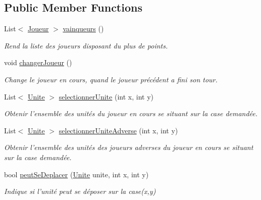 \subsection*{Public Member Functions}
\begin{DoxyCompactItemize}
\item 
List$<$ \hyperlink{class_small_world_1_1_joueur}{Joueur} $>$ \hyperlink{interface_small_world_1_1_inter_partie_a854e4e9df304af71203a90ebea6dd5aa}{vainqueurs} ()
\begin{DoxyCompactList}\small\item\em Rend la liste des joueurs disposant du plus de points. \end{DoxyCompactList}\item 
void \hyperlink{interface_small_world_1_1_inter_partie_a9d379ea16f666ff33913f4c4bb0ac148}{changer\-Joueur} ()
\begin{DoxyCompactList}\small\item\em Change le joueur en cours, quand le joueur précédent a fini son tour. \end{DoxyCompactList}\item 
List$<$ \hyperlink{class_small_world_1_1_unite}{Unite} $>$ \hyperlink{interface_small_world_1_1_inter_partie_aa29e03573a21b6d366bfb8dfb7bd50c3}{selectionner\-Unite} (int x, int y)
\begin{DoxyCompactList}\small\item\em Obtenir l'ensemble des unités du joueur en cours se situant sur la case demandée. \end{DoxyCompactList}\item 
List$<$ \hyperlink{class_small_world_1_1_unite}{Unite} $>$ \hyperlink{interface_small_world_1_1_inter_partie_a3ee997cdbcf1402c3aed3fbad6ff8c56}{selectionner\-Unite\-Adverse} (int x, int y)
\begin{DoxyCompactList}\small\item\em Obtenir l'ensemble des unités des joueurs adverses du joueur en cours se situant sur la case demandée. \end{DoxyCompactList}\item 
bool \hyperlink{interface_small_world_1_1_inter_partie_a1bebb4f8184527d91080a537c759da7b}{peut\-Se\-Deplacer} (\hyperlink{class_small_world_1_1_unite}{Unite} unite, int x, int y)
\begin{DoxyCompactList}\small\item\em Indique si l'unité peut se déposer sur la case(x,y) \end{DoxyCompactList}\item 

\end{DoxyCompactItemize}
